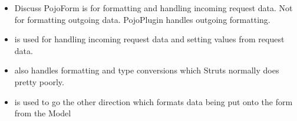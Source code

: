 \begin{ifhtml}
\begin{s5slide}
    \begin{s5notes}
      \begin{itemize}
      \item Discuss PojoForm is for formatting and handling incoming request data. Not for formatting outgoing data. PojoPlugin handles outgoing formatting.
      \item {} is used for handling incoming request data and setting  values from request data.
      \item {} also handles formatting and type conversions which Struts normally does pretty poorly.
      \item {} is used to go the other direction which formats data being put onto the form from the Model
        \end{itemize}
    \end{s5notes}
  \end{s5slide}
\end{ifhtml}
